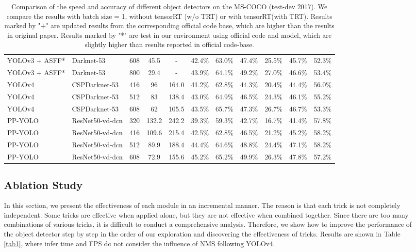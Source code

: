 \documentclass[10pt,twocolumn,letterpaper]{article}
\begin{document}
\begin{table*}[h]
{\begin{tabular}{l|l|c|cc|cccccc}
				YOLOv3 + ASFF* \cite{Liu2019Learning}& Darknet-53 & 608 &  45.5   & - &42.4\% & 63.0\% & 47.4\% & 25.5\% & 45.7\% & 52.3\% \\
				YOLOv3 + ASFF* \cite{Liu2019Learning} & Darknet-53 & 800 & 29.4   &- & 43.9\% & 64.1\% & 49.2\% & 27.0\% & 46.6\% & 53.4\% \\
				\hline
				YOLOv4 \cite{yolov4} & CSPDarknet-53 & 416 & 96  &164.0 & 41.2\% & 62.8\% & 44.3\% & 20.4\% & 44.4\% & 56.0\% \\
				YOLOv4  \cite{yolov4} & CSPDarknet-53 & 512 & 83  &138.4  & 43.0\% & 64.9\% & 46.5\% & 24.3\% & 46.1\% & 55.2\% \\
				YOLOv4  \cite{yolov4} & CSPDarknet-53 & 608  & 62  &105.5  & 43.5\% & 65.7\% & 47.3\% & 26.7\% & 46.7\% & 53.3\% \\
				\hline
				\hline
				PP-YOLO & ResNet50-vd-dcn & 320 & 132.2 &  242.2 & 39.3\% & 59.3\% & 42.7\% & 16.7\% & 41.4\% & 57.8\% \\
				PP-YOLO & ResNet50-vd-dcn & 416 & 109.6 & 215.4 & 42.5\% & 62.8\% & 46.5\% & 21.2\% & 45.2\% & 58.2\% \\
				PP-YOLO & ResNet50-vd-dcn & 512 & 89.9 & 188.4 & 44.4\%  & 64.6\% & 48.8\% & 24.4\% & 47.1\% & 58.2\% \\
				PP-YOLO& ResNet50-vd-dcn & 608 & 72.9 &  155.6 & 45.2\% & 65.2\% & 49.9\% & 26.3\% & 47.8\% & 57.2\% \\
				\hline
			\end{tabular}
		}
		\caption{Comparison of the speed and accuracy of different object detectors on the MS-COCO (test-dev 2017). We compare the results with batch size = 1, without tensorRT (w/o TRT) or with tensorRT(with TRT).
			Results marked by "+" are updated results from the corresponding official code base, which are higher than the results in original paper.
			Results marked by "*" are test in our environment using official code and model, which are slightly higher than results reported in official code-base.
		}
		\label{tab2}
	\end{table*}
	
	\subsection{Ablation Study}
	
	In this section, we present the effectiveness of each module in an incremental manner. The reason is that each trick is not completely independent. Some tricks are effective when applied alone, but they are not effective when combined together. Since there are too many combinations of various tricks, it is difficult to conduct a comprehensive analysis.
	Therefore, we show how to improve the performance of the object detector step by step in the order of our exploration and discovering the effectiveness of tricks. Results are shown in Table \ref{tab1}, where infer time and FPS do not consider the influence of NMS following YOLOv4\cite{yolov4}.
	
\end{document}
